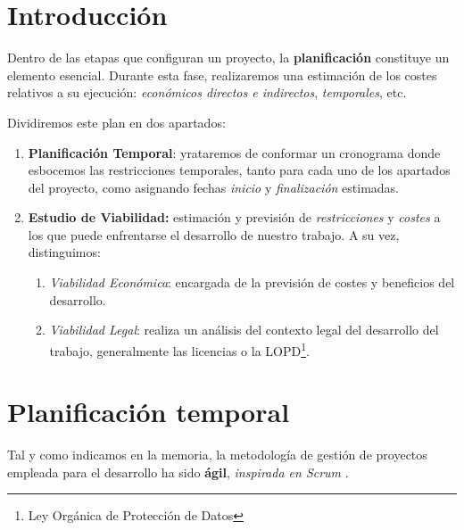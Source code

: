 
\section{Introducción}

Dentro de las etapas que configuran un proyecto, la \textbf{planificación} constituye un elemento esencial. Durante esta fase, realizaremos una estimación de los costes relativos a su ejecución: \textit{económicos directos e indirectos}, \textit{temporales}, etc.

Dividiremos este plan en dos apartados:
\begin{enumerate}
    \item \textbf{Planificación Temporal}: yrataremos de conformar un cronograma donde esbocemos las restricciones temporales, tanto para cada uno de los apartados del proyecto, como asignando fechas \textit{inicio} y \textit{finalización} estimadas.

    \item \textbf{Estudio de Viabilidad:} estimación y previsión de \textit{restricciones} y \textit{costes} a los que puede enfrentarse el desarrollo de nuestro trabajo. A su vez, distinguimos:
\begin{enumerate}
        \item \textit{Viabilidad Económica}: encargada de la previsión de costes y beneficios del desarrollo.

        \item \textit{Viabilidad Legal}: realiza un análisis del contexto legal del desarrollo del trabajo, generalmente las licencias o la LOPD\footnote{Ley Orgánica de Protección de Datos}.
    \end{enumerate}
\end{enumerate}

\section{Planificación temporal}

Tal y como indicamos en la memoria, la metodología de gestión de proyectos empleada para el desarrollo ha sido \textbf{ágil}, \textit{inspirada en Scrum} \cite{SaezHurtado2021ComoUtilizarla}.

